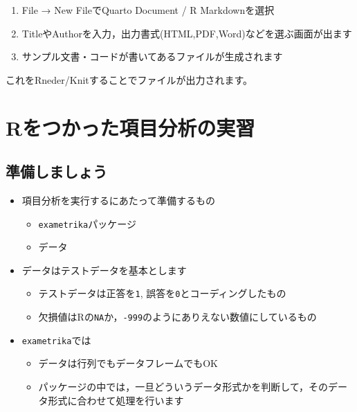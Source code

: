 \documentclass[
  a4paper,
]{ltjsbook}
\providecommand{\tightlist}{%
  \setlength{\itemsep}{0pt}\setlength{\parskip}{0pt}}\usepackage{longtable,booktabs,array}
\begin{document}
\begin{enumerate}
\def\labelenumi{\arabic{enumi}.}
\tightlist
\item
  File → New FileでQuarto Document / R Markdownを選択
\item
  TitleやAuthorを入力，出力書式(HTML,PDF,Word)などを選ぶ画面が出ます
\item
  サンプル文書・コードが書いてあるファイルが生成されます
\end{enumerate}

これをRneder/Knitすることでファイルが出力されます。


\chapter{Rをつかった項目分析の実習}\label{rux3092ux3064ux304bux3063ux305fux9805ux76eeux5206ux6790ux306eux5b9fux7fd2}

\section{準備しましょう}\label{ux6e96ux5099ux3057ux307eux3057ux3087ux3046}

\begin{itemize}
\tightlist
\item
  項目分析を実行するにあたって準備するもの

  \begin{itemize}
  \tightlist
  \item
    \texttt{exametrika}パッケージ
  \item
    データ
  \end{itemize}
\item
  データはテストデータを基本とします

  \begin{itemize}
  \tightlist
  \item
    テストデータは正答を\texttt{1},
    誤答を\texttt{0}とコーディングしたもの
  \item
    欠損値はRの\texttt{NA}か，\texttt{-999}のようにありえない数値にしているもの
  \end{itemize}
\item
  \texttt{exametrika}では

  \begin{itemize}
  \tightlist
  \item
    データは行列でもデータフレームでもOK
  \item
    パッケージの中では，一旦どういうデータ形式かを判断して，そのデータ形式に合わせて処理を行います
  \end{itemize}
\end{itemize}
\end{document}
